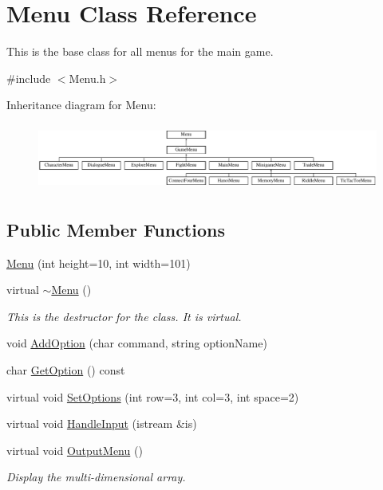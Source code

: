 \hypertarget{classMenu}{\section{Menu Class Reference}
\label{classMenu}
}


This is the base class for all menus for the main game.  




{\ttfamily \#include $<$Menu.\-h$>$}

Inheritance diagram for Menu\-:\begin{figure}[H]
\begin{center}
\leavevmode
\includegraphics[height=2.222222cm]{classMenu}
\end{center}
\end{figure}
\subsection*{Public Member Functions}
\begin{DoxyCompactItemize}
\item 
\hyperlink{classMenu_a28ea9cee39d242905df93e6baa1544ea}{Menu} (int height=10, int width=101)
\item 
virtual \hyperlink{classMenu_a831387f51358cfb88cd018e1777bc980}{$\sim$\-Menu} ()
\begin{DoxyCompactList}\small\item\em This is the destructor for the class. It is virtual. \end{DoxyCompactList}\item 
void \hyperlink{classMenu_a0e91b24974d0c9d3d29bd0ac424d0059}{Add\-Option} (char command, string option\-Name)
\item 
char \hyperlink{classMenu_a67c50ffc3f34b7ff02bfc7a1e1de3dab}{Get\-Option} () const 
\item 
virtual void \hyperlink{classMenu_acc31e14c9ed4dd2fb5dc4319738bafba}{Set\-Options} (int row=3, int col=3, int space=2)
\item 
virtual void \hyperlink{classMenu_aebc8f6c5b80202603b45da16dc978706}{Handle\-Input} (istream \&is)
\item 
virtual void \hyperlink{classMenu_a4665a914fe24a8b11d8d6c95792184b3}{Output\-Menu} ()
\begin{DoxyCompactList}\small\item\em Display the multi-\/dimensional array. \end{DoxyCompactList}\end{DoxyCompactItemize}
